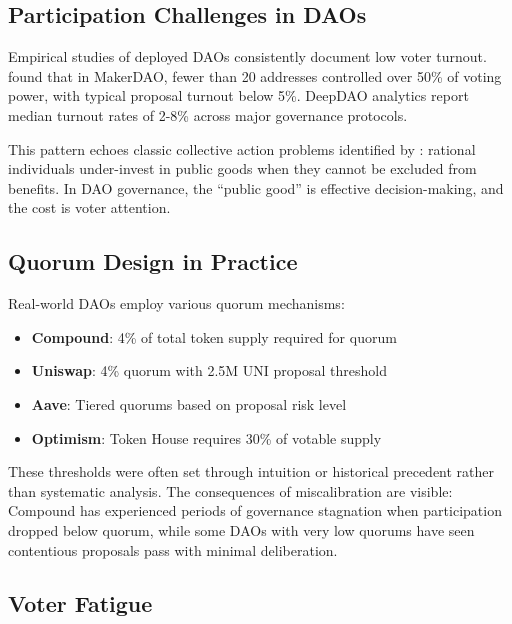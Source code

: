 
\subsection{Participation Challenges in DAOs}

Empirical studies of deployed DAOs consistently document low voter turnout. \citet{fritsch2022analyzing} found that in MakerDAO, fewer than 20 addresses controlled over 50\% of voting power, with typical proposal turnout below 5\%. DeepDAO analytics \citep{deepdao2023analytics} report median turnout rates of 2-8\% across major governance protocols.

This pattern echoes classic collective action problems identified by \citet{olson1965logic}: rational individuals under-invest in public goods when they cannot be excluded from benefits. In DAO governance, the ``public good'' is effective decision-making, and the cost is voter attention.

\subsection{Quorum Design in Practice}

Real-world DAOs employ various quorum mechanisms:

\begin{itemize}
    \item \textbf{Compound}: 4\% of total token supply required for quorum
    \item \textbf{Uniswap}: 4\% quorum with 2.5M UNI proposal threshold
    \item \textbf{Aave}: Tiered quorums based on proposal risk level
    \item \textbf{Optimism}: Token House requires 30\% of votable supply
\end{itemize}

These thresholds were often set through intuition or historical precedent rather than systematic analysis. The consequences of miscalibration are visible: Compound has experienced periods of governance stagnation when participation dropped below quorum, while some DAOs with very low quorums have seen contentious proposals pass with minimal deliberation.

\subsection{Voter Fatigue}

